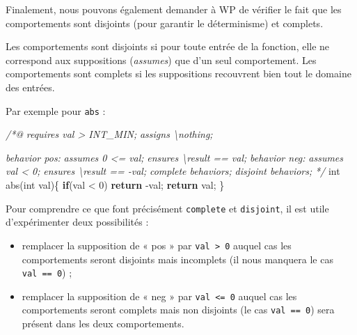 \documentclass[12pt,francais,]{scrbook}
\newenvironment{Shaded}{}{}
\newcommand{\KeywordTok}[1]{\textcolor[rgb]{0.00,0.44,0.13}{\textbf{{#1}}}}
\newcommand{\DataTypeTok}[1]{\textcolor[rgb]{0.56,0.13,0.00}{{#1}}}
\newcommand{\DecValTok}[1]{\textcolor[rgb]{0.25,0.63,0.44}{{#1}}}
\newcommand{\CommentTok}[1]{\textcolor[rgb]{0.38,0.63,0.69}{\textit{{#1}}}}
\newcommand{\NormalTok}[1]{{#1}}
\providecommand{\tightlist}{%
  \setlength{\itemsep}{0pt}\setlength{\parskip}{0pt}}
\begin{document}
Finalement, nous pouvons également demander à WP de vérifier le fait que
les comportements sont disjoints (pour garantir le déterminisme) et
complets.

Les comportements sont disjoints si pour toute entrée de la fonction,
elle ne correspond aux suppositions (\emph{assumes}) que d'un seul
comportement. Les comportements sont complets si les suppositions
recouvrent bien tout le domaine des entrées.



Par exemple pour \texttt{abs} :

\begin{footnotesize}\begin{Shaded}
\begin{Highlighting}[]
\CommentTok{/*@}
\CommentTok{  requires val > INT_MIN;}
\CommentTok{  assigns  \textbackslash{}nothing;}

\CommentTok{  behavior pos:}
\CommentTok{    assumes 0 <= val;}
\CommentTok{    ensures \textbackslash{}result == val;}
\CommentTok{  }
\CommentTok{  behavior neg:}
\CommentTok{    assumes val < 0;}
\CommentTok{    ensures \textbackslash{}result == -val;}
\CommentTok{ }
\CommentTok{  complete behaviors;}
\CommentTok{  disjoint behaviors;}
\CommentTok{*/}
\DataTypeTok{int} \NormalTok{abs(}\DataTypeTok{int} \NormalTok{val)\{}
  \KeywordTok{if}\NormalTok{(val < }\DecValTok{0}\NormalTok{) }\KeywordTok{return} \NormalTok{-val;}
  \KeywordTok{return} \NormalTok{val;}
\NormalTok{\}}
\end{Highlighting}
\end{Shaded}\end{footnotesize}

Pour comprendre ce que font précisément \texttt{complete} et
\texttt{disjoint}, il est utile d'expérimenter deux possibilités :

\begin{itemize}
\tightlist
\item
  remplacer la supposition de « pos » par
  \texttt{val\ \textgreater{}\ 0} auquel cas les comportements seront
  disjoints mais incomplets (il nous manquera le cas
  \texttt{val\ ==\ 0}) ;
\item
  remplacer la supposition de « neg » par \texttt{val\ \textless{}=\ 0}
  auquel cas les comportements seront complets mais non disjoints (le
  cas \texttt{val\ ==\ 0}) sera présent dans les deux comportements.
\end{itemize}
\end{document}
